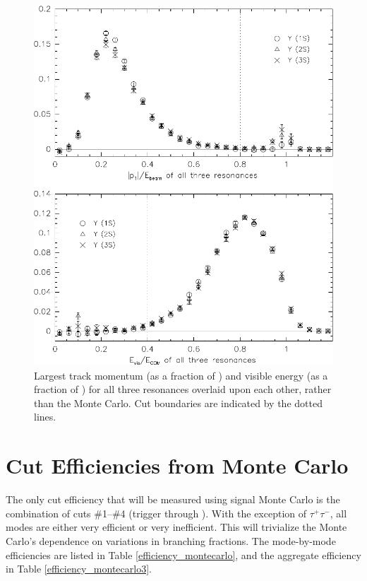 \begin{figure}
  \includegraphics[width=\linewidth]{plots/efficiency_overlay}
  \caption{\label{efficiency_overlay} Largest track momentum (as a
  fraction of \ebeam) and visible energy (as a fraction of \ecom) for
  all three resonances overlaid upon each other, rather than the
  Monte Carlo.  Cut boundaries are indicated by the dotted lines.}
\end{figure}

\section{Cut Efficiencies from Monte Carlo}

The only cut efficiency that will be measured using signal Monte Carlo
is the combination of cuts \#1--\#4 (trigger through \pone).  With the
exception of $\tau^+\tau^-$, all modes are either very efficient or
very inefficient.  This will trivialize the Monte Carlo's dependence
on variations in branching fractions.  The mode-by-mode efficiencies
are listed in Table \ref{efficiency_montecarlo}, and the aggregate
efficiency in Table \ref{efficiency_montecarlo3}.

